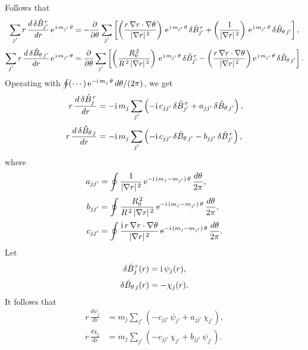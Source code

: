 \documentclass[12pt]{article}
\begin{document}
Follows that
\begin{align}
\sum_{j'} r\,\frac{d\,\delta \hat{B}^{\,r}_{j'}}{dr}\,{\rm e}^{\,{\rm i}\,m_{j'}\,\theta}&=-\frac{\partial}{\partial\theta}\sum_{j'} \left[\left(\frac{r\,\nabla r\cdot\nabla \theta}{|\nabla r|^{\,2}}\right)\,{\rm e}^{\,{\rm i}\,m_{j'}\,\theta}\,\delta \hat{B}^{\,r}_{j'} +\left(\frac{1}{|\nabla r|^{\,2}}\right)\,{\rm e}^{\,{\rm i}\,m_{j'}\,\theta}\,\delta \hat{B}_{\theta\,j'}\right],\\[0.5ex]
\sum_{j'} r\,\frac{d\,\delta \hat{B}_{\theta\,j'}}{dr}\,{\rm e}^{\,{\rm i}\,m_{j'}\,\theta}
&= \frac{\partial}{\partial\theta}\sum_{j'}\left[\left(\frac{R_0^{\,2}}{R^{\,2}\,|\nabla r|^{\,2}}\right)\,{\rm e}^{\,{\rm i}\,m_{j'}\,\theta}\,\delta \hat{B}^{\,r}_{j'}
-\left(\frac{r\,\nabla r\cdot\nabla\theta}{|\nabla r|^{\,2}}\right){\rm e}^{\,{\rm i}\,m_{j'}\,\theta}\,\delta \hat{B}_{\theta\,j'}\right].
\end{align}
Operating with $\oint(\cdots)\, {\rm e}^{-{\rm i}\,m_j\,\theta}\,d\theta/(2\pi)$, we
get
\begin{align}
r\,\frac{d\,\delta \hat{B}_j^{\,r}}{dr}
&= -{\rm i}\,m_j\sum_{j'}\left(-{\rm i}\,c_{jj'}\,\delta \hat{B}_{j'}^{\,r}
+a_{jj'}\,\delta \hat{B}_{\theta\,j'}\right),\\[0.5ex]
r\,\frac{d\,\delta \hat{B}_{\theta\,j}}{dr}
&= -{\rm i}\,m_j\sum_{j'}\left(-{\rm i}\,c_{jj'}\,\delta \hat{B}_{\theta\,j'}
-b_{jj'}\,\delta \hat{B}_{j'}^{\,r}\right),
\end{align}
where
\begin{align}
a_{jj'} &= \oint \frac{1}{|\nabla r|^{\,2}}\,
{\rm e}^{-{\rm i}\,(m_j-m_{j'})\,\theta}
\,\frac{d\theta}{2\pi},\\[0.5ex]
b_{jj'}& = \oint \frac{R_0^{\,2}}{R^{\,2}\,|\nabla r|^{\,2}}\,
{\rm e}^{-{\rm i}\,(m_j-m_{j'})\,\theta}
\,\frac{d\theta}{2\pi},\\[0.5ex]
c_{jj'} &= \oint \frac{{\rm i}\,r\,\nabla r\cdot\nabla \theta}{|\nabla r|^{\,2}}\,
{\rm e}^{-{\rm i}\,(m_j-m_{j'})\,\theta}
\,\frac{d\theta}{2\pi}.
\end{align}
Let
\begin{align}
\delta \hat{B}_{j}^{\,r}(r) &={\rm i}\,\psi_j(r),\\[0.5ex]
\delta \hat{B}_{\theta\,j}(r)&= -\chi_j(r).
\end{align}
It follows that
\begin{align}
r\,\frac{d\psi_j}{dr} &=m_j\sum_{j'}\left(-c_{jj'}\,\psi_{j'} + a_{jj'}\,\chi_{j'}\right),\\[0.5ex]
r\,\frac{d\chi_j}{dr} &=m_j\sum_{j'}\left(-c_{jj'}\,\chi_{j'} + b_{jj'}\,\psi_{j'}\right).
\end{align}
\end{document}
